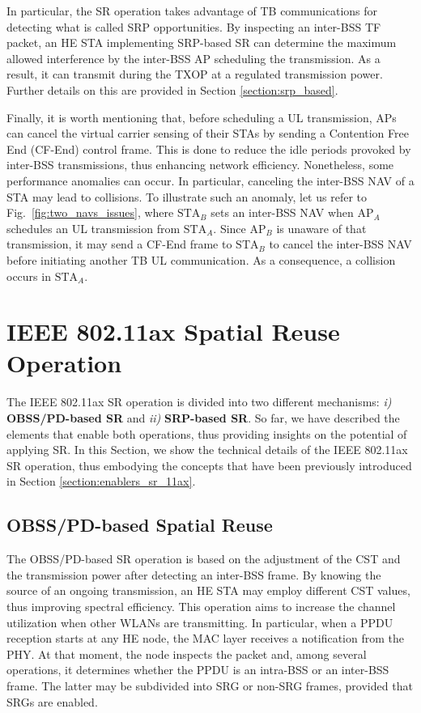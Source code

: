 \documentclass[comsoc]{IEEEtran}
\begin{document}
	In particular, the SR operation takes advantage of TB communications for detecting what is called SRP opportunities. By inspecting an inter-BSS TF packet, an HE STA implementing SRP-based SR can determine the maximum allowed interference by the inter-BSS AP scheduling the transmission. As a result, it can transmit during the TXOP at a regulated transmission power. Further details on this are provided in Section \ref{section:srp_based}.
	
	Finally, it is worth mentioning that, before scheduling a UL transmission, APs can cancel the virtual carrier sensing of their STAs by sending a Contention Free End (CF-End) control frame. This is done to reduce the idle periods provoked by inter-BSS transmissions, thus enhancing network efficiency. Nonetheless, some performance anomalies can occur. In particular, canceling the inter-BSS NAV of a STA may lead to collisions. To illustrate such an anomaly, let us refer to Fig.~\ref{fig:two_navs_issues}, where $\text{STA}_{B}$ sets an inter-BSS NAV when $\text{AP}_{A}$ schedules an UL transmission from $\text{STA}_{A}$. Since $\text{AP}_{B}$ is unaware of that transmission, it may send a CF-End frame to $\text{STA}_{B}$ to cancel the inter-BSS NAV before initiating another TB UL communication. As a consequence, a collision occurs in $\text{STA}_{A}$.
	
	
	\section{IEEE 802.11ax Spatial Reuse Operation}
	\label{section:operation_sr_11ax}
	The IEEE 802.11ax SR operation is divided into two different mechanisms: \emph{i)} \textbf{OBSS/PD-based SR} and \emph{ii)} \textbf{SRP-based SR}. So far, we have described the elements that enable both operations, thus providing insights on the potential of applying SR. In this Section, we show the technical details of the IEEE 802.11ax SR operation, thus embodying the concepts that have been previously introduced in Section \ref{section:enablers_sr_11ax}.
	
	\subsection{OBSS/PD-based Spatial Reuse}
	\label{section:obss_pd_based}
	The OBSS/PD-based SR operation is based on the adjustment of the CST and the transmission power after detecting an inter-BSS frame. By knowing the source of an ongoing transmission, an HE STA may employ different CST values, thus improving spectral efficiency. This operation aims to increase the channel utilization when other WLANs are transmitting. In particular, when a PPDU reception starts at any HE node, the MAC layer receives a notification from the PHY. At that moment, the node inspects the packet and, among several operations, it determines whether the PPDU is an intra-BSS or an inter-BSS frame. The latter may be subdivided into SRG or non-SRG frames, provided that SRGs are enabled.
	
\end{document}
